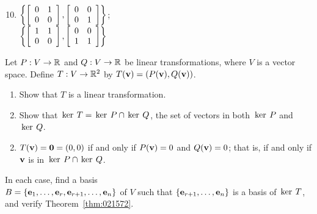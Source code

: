 \begin{multicols}{2}
\begin{ex}
\begin{sol}
\begin{enumerate}[label={\alph*.}]
\setcounter{enumi}{9}
\item $\left\lbrace \left[ \begin{array}{rr}
0 & 1 \\
0 & 0
\end{array} \right], \left[ \begin{array}{rr}
0 & 0 \\
0 & 1
\end{array} \right] \right\rbrace$; \\ $\left\lbrace \left[ \begin{array}{rr}
1 & 1 \\
0 & 0
\end{array} \right], \left[ \begin{array}{rr}
0 & 0 \\
1 & 1
\end{array} \right] \right\rbrace$

\end{enumerate}
\end{sol}
\end{ex}

\begin{ex}
Let $P : V \to \mathbb{R}$ and $Q : V \to \mathbb{R}$ be linear transformations, where $V$ is a vector space. Define $T : V \to \mathbb{R}^2$ by $T(\textbf{v}) = (P(\textbf{v}), Q(\textbf{v}))$.


\begin{enumerate}[label={\alph*.}]
\item Show that $T$ is a linear transformation.

\item Show that $\thinspace\operatorname{ker \medspace}T = \thinspace\operatorname{ker \medspace}P \cap \thinspace\operatorname{ker \medspace}Q$, the set of vectors in both $\thinspace\operatorname{ker \medspace}P$ and $\thinspace\operatorname{ker \medspace}Q$.

\end{enumerate}
\begin{sol}
\begin{enumerate}[label={\alph*.}]
\setcounter{enumi}{1}
\item  $T(\textbf{v}) = \textbf{0} = (0, 0)$ if and only if $P(\textbf{v}) = 0$ and $Q(\textbf{v}) = 0$; that is, if and only if $\textbf{v}$ is in $\thinspace\operatorname{ker \medspace}P \cap \thinspace\operatorname{ker \medspace}Q$.

\end{enumerate}
\end{sol}
\end{ex}

\begin{ex}
In each case, find a basis \\ $B = \{\textbf{e}_{1}, \dots, \textbf{e}_{r}, \textbf{e}_{r+1}, \dots, \textbf{e}_{n}\}$ of $V$ such that $\{\textbf{e}_{r+1}, \dots, \textbf{e}_{n}\}$ is a basis of $\thinspace\operatorname{ker \medspace}T$, and verify Theorem~\ref{thm:021572}.



\end{ex}
\end{multicols}

